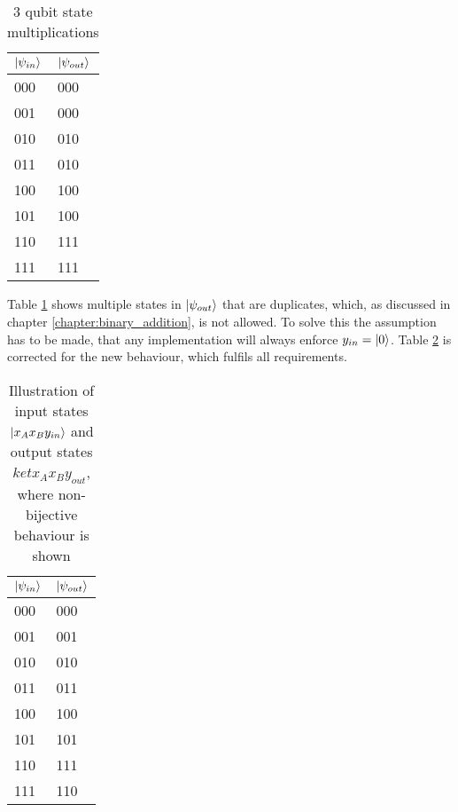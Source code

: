 \begin{table}[!h]
\centering
\begin{tabular}{|l|l|}
\hline
$\ket{\psi_{in}}$ & $\ket{\psi_{out}}$ \\ \hline
000               & 000                \\ \hline
001               & 000                \\ \hline
010               & 010                \\ \hline
011               & 010                \\ \hline
100               & 100                \\ \hline
101               & 100                \\ \hline
110               & 111                \\ \hline
111               & 111                \\ \hline
\end{tabular}
\caption{3 qubit state multiplications}
\label{table:three_qubit_state_multiplications}
\end{table}

Table \ref{table:three_qubit_state_multiplications} shows multiple states in $\ket{\psi_{out}}$ that are duplicates, which, as discussed in chapter \ref{chapter:binary_addition}, is not allowed. To solve this the assumption has to be made, that any implementation will always enforce $y_{in} = \ket{0}$. Table \ref{table:three_qubit_state_multiplications_corrected} is corrected for the new behaviour, which fulfils all requirements.

\begin{table}[!h]
\centering
\begin{tabular}{|l|l|}
\hline
$\ket{\psi_{in}}$ & $\ket{\psi_{out}}$ \\ \hline
000               & 000                \\ \hline
001               & 001                \\ \hline
010               & 010                \\ \hline
011               & 011                \\ \hline
100               & 100                \\ \hline
101               & 101                \\ \hline
110               & 111                \\ \hline
111               & 110                \\ \hline
\end{tabular}
\caption{Illustration of input states $\ket{x_Ax_By_{in}}$ and output states $ket{x_Ax_By_{out}}$, where non-bijective behaviour is shown}
\label{table:three_qubit_state_multiplications_corrected}
\end{table}


